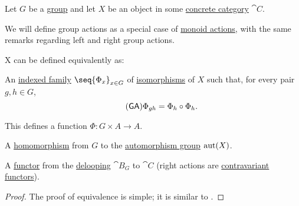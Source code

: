 \begin{definition}\label{def:group_action}
  Let \( G \) be a \hyperref[def:group]{group} and let \( X \) be an object in some \hyperref[def:concrete_category]{concrete category} \( \cat{C} \).

  We will define group actions as a special case of \hyperref[def:monoid_action]{monoid actions}, with the same remarks regarding left and right group actions.

  X  can be defined equivalently as:
  \begin{thmenum}
     An \hyperref[def:cartesian_product/indexed_family]{indexed family} \( \seq{ \Phi_x }_{x \in G} \) of \hyperref[def:morphism_invertibility/isomorphism]{isomorphisms} of \( X \) such that, for every pair \( g, h \in G \),
    \begin{equation}\label{eq:def:group_action/family/compatibility}\tag{\logic{GA}}
      \Phi_{gh} = \Phi_h \bincirc \Phi_h.
    \end{equation}

    This defines a function \( \Phi: G \times A \to A \).

     A \hyperref[def:group/homomorphism]{homomorphism} from \( G \) to the \hyperref[def:automorphism_group]{automorphism group} \( \operatorname{aut}(X) \).

     A \hyperref[def:functor]{functor} from the \hyperref[def:monoid_delooping]{delooping} \( \cat{B}_G \) to \( \cat{C} \) (right actions are \hyperref[rem:contravariant_functor]{contravariant functors}).
  \end{thmenum}
\end{definition}
\begin{proof}
  The proof of equivalence is simple; it is similar to .
\end{proof}

